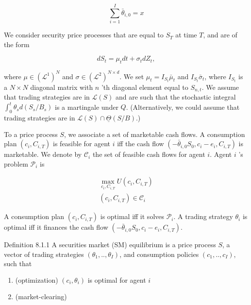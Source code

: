 \documentclass[\topdir/lecture\_notes.tex]{subfiles}
\begin{document}
\begin{equation}
\sum_{i=1}^{I} \bar{\theta}_{i, 0}=x
\end{equation}

We consider security price processes that are equal to \(S_{T}\) at time \(T\), and are of the form

\begin{equation}
d S_{t}=\mu_{t} d t+\sigma_{t} d Z_{t},
\end{equation}

where \(\mu \in\left(\mathcal{L}^{1}\right)^{N}\) and \(\sigma \in\left(\mathcal{L}^{2}\right)^{N \times d}\). We set \(\mu_{t}=I_{S_{t}} \bar{\mu}_{t}\) and \(I_{S_{t}} \bar{\sigma}_{t}\), where \(I_{S_{t}}\) is a \(N \times N\) diagonal matrix with \(n\) 'th diagonal element equal to \(S_{n, t}\). We assume that trading strategies are in \(\mathcal{L}(S)\) and are such that the stochastic integral \(\int_{0}^{t} \theta_{s} d\left(S_{s} / B_{s}\right)\) is a martingale under \(Q\). (Alternatively, we could assume that trading strategies are in \(\mathcal{L}(S) \cap \underline{\Theta}(S / B)\).)

To a price process \(S\), we associate a set of marketable cash flows. A consumption plan \(\left(c_{i}, C_{i, T}\right)\) is feasible for agent \(i\) iff the cash flow \(\left(-\bar{\theta}_{i, 0} S_{0}, c_{i}-e_{i}, C_{i, T}\right)\) is marketable. We denote by \(\mathcal{C}_{i}\) the set of feasible cash flows for agent \(i\). Agent \(i\) 's problem \(\mathcal{P}_{i}\) is

\begin{equation}
\begin{gathered}
\max _{c_{i}, C_{i, T}} U\left(c_{i}, C_{i, T}\right) \\
\left(c_{i}, C_{i, T}\right) \in \mathcal{C}_{i}
\end{gathered}
\end{equation}

A consumption plan \(\left(c_{i}, C_{i, T}\right)\) is optimal iff it solves \(\mathcal{P}_{i}\). A trading strategy \(\theta_{i}\) is optimal iff it finances the cash flow \(\left(-\bar{\theta}_{i, 0} S_{0}, c_{i}-e_{i}, C_{i, T}\right)\).

Definition 8.1.1 A securities market (SM) equilibrium is a price process \(S\), a vector of trading strategies \(\left(\theta_{1}, . ., \theta_{I}\right)\), and consumption policies \(\left(c_{1}, . ., c_{I}\right)\), such that

\begin{enumerate}
  \item (optimization) \(\left(c_{i}, \theta_{i}\right)\) is optimal for agent \(i\)

  \item (market-clearing)

\end{enumerate}
\end{document}
